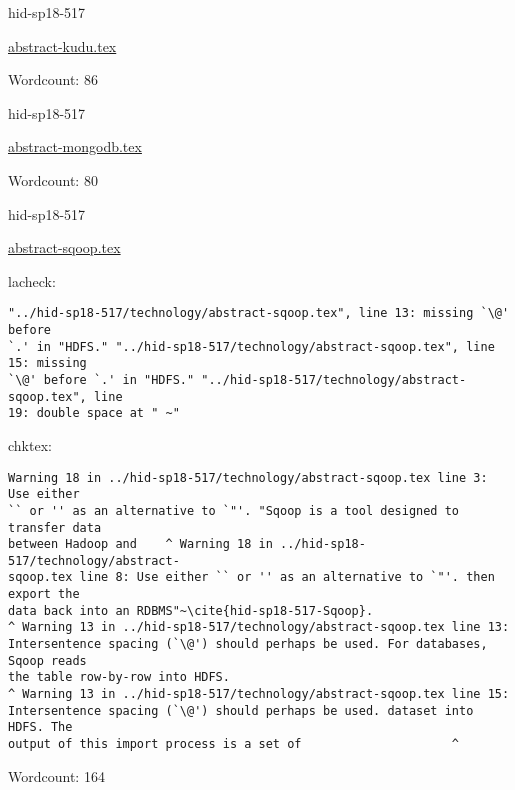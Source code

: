 \begin{IU}

hid-sp18-517

\href{https://github.com/cloudmesh-community/hid-sp18-517/blob/master//technology/abstract-kudu.tex}{abstract-kudu.tex}

 

Wordcount: 86

\end{IU}



\begin{IU}

hid-sp18-517

\href{https://github.com/cloudmesh-community/hid-sp18-517/blob/master//technology/abstract-mongodb.tex}{abstract-mongodb.tex}

 

Wordcount: 80

\end{IU}



\begin{IU}

hid-sp18-517

\href{https://github.com/cloudmesh-community/hid-sp18-517/blob/master//technology/abstract-sqoop.tex}{abstract-sqoop.tex}

 
lacheck:
\begin{tiny}
\begin{verbatim}
"../hid-sp18-517/technology/abstract-sqoop.tex", line 13: missing `\@' before
`.' in "HDFS." "../hid-sp18-517/technology/abstract-sqoop.tex", line 15: missing
`\@' before `.' in "HDFS." "../hid-sp18-517/technology/abstract-sqoop.tex", line
19: double space at " ~"
\end{verbatim}
\end{tiny}
chktex:
\begin{tiny}
\begin{verbatim}
Warning 18 in ../hid-sp18-517/technology/abstract-sqoop.tex line 3: Use either
`` or '' as an alternative to `"'. "Sqoop is a tool designed to transfer data
between Hadoop and    ^ Warning 18 in ../hid-sp18-517/technology/abstract-
sqoop.tex line 8: Use either `` or '' as an alternative to `"'. then export the
data back into an RDBMS"~\cite{hid-sp18-517-Sqoop}.
^ Warning 13 in ../hid-sp18-517/technology/abstract-sqoop.tex line 13:
Intersentence spacing (`\@') should perhaps be used. For databases, Sqoop reads
the table row-by-row into HDFS.
^ Warning 13 in ../hid-sp18-517/technology/abstract-sqoop.tex line 15:
Intersentence spacing (`\@') should perhaps be used. dataset into HDFS. The
output of this import process is a set of                     ^
\end{verbatim}
\end{tiny}

Wordcount: 164

\end{IU}

